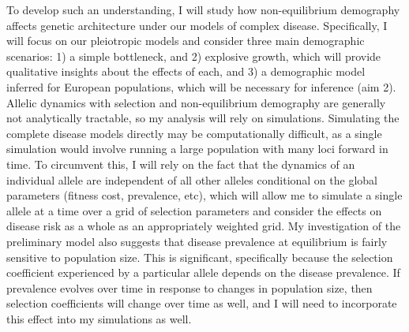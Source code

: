 \documentclass[11pt]{article}
\begin{document}
To develop such an understanding, I will study how non-equilibrium demography affects genetic architecture under our models of complex disease. Specifically, I will focus on our pleiotropic models and consider three main demographic scenarios: 1) a simple bottleneck, and 2) explosive growth, which will provide qualitative insights about the effects of each, and 3) a demographic model inferred for European populations\cite{Tennessen:2012ek, Schiffels:2014cu}, which will be necessary for inference (aim 2).  Allelic dynamics with selection and non-equilibrium demography are generally not analytically tractable, so my analysis will rely on simulations. Simulating the complete disease models directly may be computationally difficult, as a single simulation would involve running a large population with many loci forward in time. To circumvent this, I will rely on the fact that the dynamics of an individual allele are independent of all other alleles conditional on the global parameters (fitness cost, prevalence, etc), which will allow me to simulate a single allele at a time over a grid of selection parameters and consider the effects on disease risk as a whole as an appropriately weighted grid. My investigation of the preliminary model also suggests that disease prevalence at equilibrium is fairly sensitive to population size. This is significant, specifically because the selection coefficient experienced by a particular allele depends on the disease prevalence. If prevalence evolves over time in response to changes in population size, then selection coefficients will change over time as well, and I will need to incorporate this effect into my simulations as well.

\end{document}
